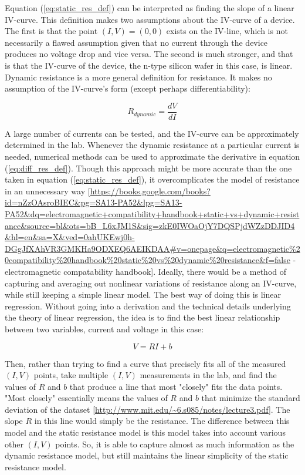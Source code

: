 Equation (\ref{eq:static_res_def}) can be interpreted as finding the slope of a linear IV-curve. This definition makes two assumptions about the IV-curve of a device. The first is that the point $(I,V) = (0,0)$ exists on the IV-line, which is not necessarily a flawed assumption given that no current through the device produces no voltage drop and vice versa. The second is much stronger, and that is that the IV-curve of the device, the n-type silicon wafer in this case, is linear.
Dynamic resistance is a more general definition for resistance. It makes no assumption of the IV-curve's form (except perhaps differentiability):

\begin{equation}
	\label{eq:diff_res_def}
	R_{dynamic} = \frac{dV}{dI}
\end{equation}

A large number of currents can be tested, and the IV-curve can be approximately determined in the lab. Whenever the dynamic resistance at a particular current is needed, numerical methods can be used to approximate the derivative in equation (\ref{eq:diff_res_def}). Though this approach might be more accurate than the one taken in equation (\ref{eq:static_res_def}), it overcomplicates the model of resistance in an unnecessary way [\url{https://books.google.com/books?id=nZzOAsroBIEC&pg=SA13-PA52&lpg=SA13-PA52&dq=electromagnetic+compatibility+handbook+static+vs+dynamic+resistance&source=bl&ots=bB_L6xJM1S&sig=zkE0IWOaOjY7DQSPjdWZzDDJID4&hl=en&sa=X&ved=0ahUKEwj0h-DGgJfXAhVR3GMKHa9ODXEQ6AEIKDAA#v=onepage&q=electromagnetic\%20compatibility\%20handbook\%20static\%20vs\%20dynamic\%20resistance&f=false} - electromagnetic compatability handbook].
Ideally, there would be a method of capturing and averaging out nonlinear variations of resistance along an IV-curve, while still keeping a simple linear model. The best way of doing this is linear regression. Without going into a derivation and the technical details underlying the theory of linear regression, the idea is to find the best linear relationship between two variables, current and voltage in this case:

\begin{equation}
	\label{eq:linear_reg}
	V = RI + b
\end{equation}

Then, rather than trying to find a curve that precisely fits all of the measured $(I,V)$ points, take multiple $(I,V)$ measurements in the lab, and find the values of $R$ and $b$ that produce a line that most "closely" fits the data points. "Most closely" essentially means the values of $R$ and $b$ that minimize the standard deviation of the dataset [\url{http://www.mit.edu/~6.s085/notes/lecture3.pdf}].
The slope $R$ in this line would simply be the resistance. The difference between this model and the static resistance model is this model takes into account various other $(I,V)$ points. So, it is able to capture almost as much information as the dynamic resistance model, but still maintains the linear simplicity of the static resistance model.
